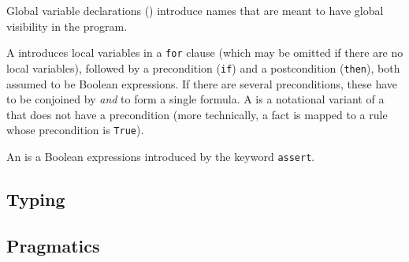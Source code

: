 Global variable declarations () introduce names
that are meant to have global visibility in the program.

A  introduces local variables in a
\texttt{for} clause (which may be omitted if there are no local variables),
followed by a precondition (\texttt{if}) and a postcondition (\texttt{then}),
both assumed to be Boolean expressions. If there are several preconditions,
these have to be conjoined by \emph{and} to form a single formula. 
A  is a notational variant of a  
that does not have a precondition (more technically, a fact is mapped to a
rule whose precondition is \texttt{True}).

An  is a Boolean expressions introduced by the keyword \texttt{assert}.


\subsection{Typing}\label{sec:typing}




\subsection{Pragmatics}\label{sec:pragmatics}



